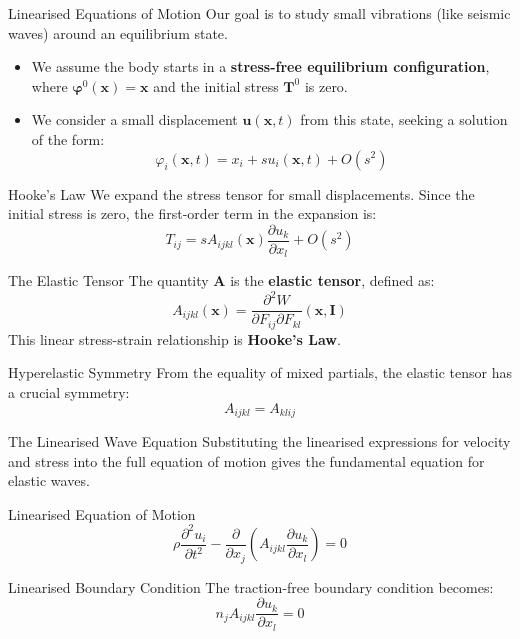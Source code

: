 \documentclass{beamer}
\begin{document}

\begin{frame}{Linearised Equations of Motion}
    Our goal is to study small vibrations (like seismic waves) around an equilibrium state.
    \begin{itemize}
        \item We assume the body starts in a \textbf{stress-free equilibrium configuration}, where $\boldsymbol{\varphi}^0(\mathbf{x}) = \mathbf{x}$ and the initial stress $\mathbf{T}^0$ is zero.
        \pause
        \item We consider a small displacement $\mathbf{u}(\mathbf{x}, t)$ from this state, seeking a solution of the form:
        $$ \varphi_i(\mathbf{x}, t) = x_i + s u_i(\mathbf{x}, t) + O(s^2) $$
    \end{itemize}
\end{frame}

\begin{frame}{Hooke's Law}
    We expand the stress tensor for small displacements. Since the initial stress is zero, the first-order term in the expansion is:
    $$ T_{ij} = s A_{ijkl}(\mathbf{x}) \frac{\partial u_k}{\partial x_l} + O(s^2) $$
    \pause
    \begin{block}{The Elastic Tensor}
        The quantity $\mathbf{A}$ is the \textbf{elastic tensor}, defined as:
        $$ A_{ijkl}(\mathbf{x}) = \frac{\partial^2 W}{\partial F_{ij}\partial F_{kl}}(\mathbf{x}, \mathbf{I}) $$
        This linear stress-strain relationship is \textbf{Hooke's Law}.
    \end{block}
    \pause
    \begin{alertblock}{Hyperelastic Symmetry}
        From the equality of mixed partials, the elastic tensor has a crucial symmetry:
        $$ A_{ijkl} = A_{klij} $$
    \end{alertblock}
\end{frame}

\begin{frame}{The Linearised Wave Equation}
    Substituting the linearised expressions for velocity and stress into the full equation of motion gives the fundamental equation for elastic waves.
    \begin{alertblock}{Linearised Equation of Motion}
        $$ \rho\frac{\partial^2 u_{i}}{\partial t^2} - \frac{\partial}{\partial x_{j}}\left(A_{ijkl}\frac{\partial u_{k}}{\partial x_{l}}\right) = 0 $$
    \end{alertblock}
    \pause
    \begin{block}{Linearised Boundary Condition}
        The traction-free boundary condition becomes:
        $$ n_{j}A_{ijkl}\frac{\partial u_{k}}{\partial x_{l}} = 0 $$
    \end{block}
\end{frame}
\end{document}
